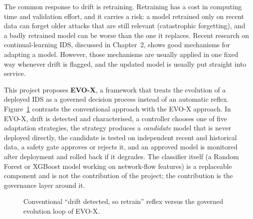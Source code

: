 \documentclass{article}
\begin{document}
The common response to drift is retraining. Retraining has a cost in computing time and validation effort, and it carries a risk: a model retrained only on recent data can forget older attacks that are still relevant (catastrophic forgetting), and a badly retrained model can be worse than the one it replaces. Recent research on continual-learning IDS, discussed in Chapter~2, shows good mechanisms for adapting a model. However, those mechanisms are usually applied in one fixed way whenever drift is flagged, and the updated model is usually put straight into service.

This project proposes \textbf{EVO-X}, a framework that treats the evolution of a deployed IDS as a governed decision process instead of an automatic reflex. Figure~\ref{fig:conceptual} contrasts the conventional approach with the EVO-X approach. In EVO-X, drift is detected and characterised, a controller chooses one of five adaptation strategies, the strategy produces a \emph{candidate} model that is never deployed directly, the candidate is tested on independent recent and historical data, a safety gate approves or rejects it, and an approved model is monitored after deployment and rolled back if it degrades. The classifier itself (a Random Forest or XGBoost model working on network-flow features) is a replaceable component and is not the contribution of the project; the contribution is the governance layer around it.

\begin{figure}[h]
\centering
{}
\caption{Conventional ``drift detected, so retrain'' reflex versus the governed evolution loop of EVO-X.}
\label{fig:conceptual}
\end{figure}
\end{document}
